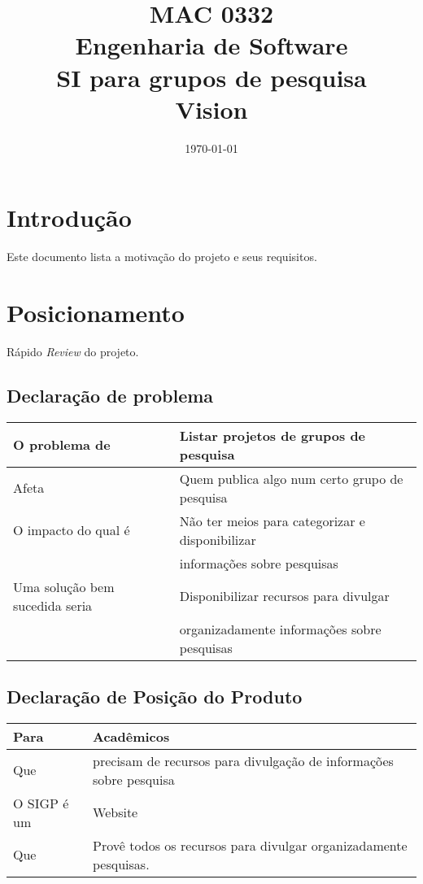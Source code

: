 \documentclass[11pt, a4paper]{article}
\title{MAC 0332\\
	Engenharia de Software\\
	SI para grupos de pesquisa\\
	Vision}
\date{\today}
\begin{document}
	\maketitle
	\newpage
    \section{Introdução}
        Este documento lista a motivação do projeto e seus requisitos.
    
    \section{Posicionamento}
        Rápido \emph{Review} do projeto.
        
        \subsection{Declaração de problema}
            \begin{tabular}{| l | l |}
                \hline                       
                O problema de & Listar projetos de grupos de pesquisa \\ \hline
                Afeta & Quem publica algo num certo grupo de pesquisa \\ \hline
                O impacto do qual é & Não ter meios para categorizar e disponibilizar\\ 
                                                 &  informações sobre pesquisas \\ \hline
                Uma solução bem sucedida seria & Disponibilizar recursos para divulgar \\
                                                                    & organizadamente informações sobre pesquisas \\
                \hline  
            \end{tabular}
        
        \subsection{Declaração de Posição do Produto}
            \begin{tabular}{| l | l |}
                \hline                       
                Para & Acadêmicos \\ \hline
                Que  & precisam de recursos para divulgação de informações sobre pesquisa \\ \hline
                O SIGP é um & Website \\ \hline
                Que & Provê todos os recursos para divulgar organizadamente pesquisas. \\
                \hline
            \end{tabular}
\end{document}
